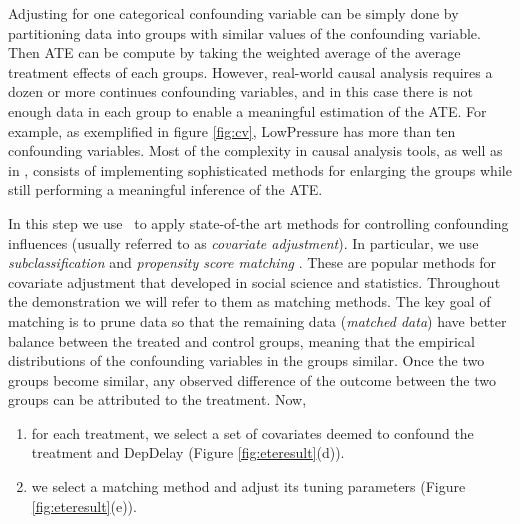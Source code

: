 Adjusting for one categorical confounding variable can be simply done by partitioning data into
 groups with similar values of the confounding variable. Then ATE can be compute by taking the weighted average of the average treatment effects of each groups. However, real-world causal analysis requires a dozen or more continues confounding variables, and in this case there is not enough data in each group to enable a meaningful estimation of the ATE. For example, as exemplified in figure \ref{fig:cv}, LowPressure has more than ten confounding variables.  Most of the complexity in causal analysis tools, as well as in \GSQL, consists of implementing sophisticated methods for enlarging the groups while still performing a meaningful inference of the ATE.
In this step we use \GSQL\ to apply state-of-the art methods for controlling confounding influences (usually referred to as {\em covariate adjustment}).
In particular, we use {\em subclassification} and {\it propensity score matching} \cite{Rubin1983b,IacKinPor09,rosenbaum1984reducing}.
These are popular methods for  covariate adjustment that developed in social science and statistics. Throughout the demonstration we will refer to them as matching methods.
The key goal of matching is to prune data so that
the remaining data ({\em matched data}) have better balance between the treated and control groups, meaning that the empirical distributions of the confounding variables in the groups  similar.
Once the two groups become similar, any observed difference of the outcome between the two groups can be attributed to the treatment. Now,
     \begin{enumerate}
      \item for each treatment, we select a set of covariates deemed to confound the treatment and DepDelay (Figure \ref{fig:eteresult}(d)).
      \item we select a matching method and adjust its tuning parameters (Figure \ref{fig:eteresult}(e)).
\end{enumerate}

